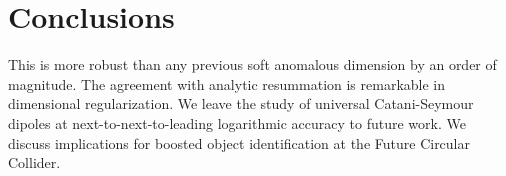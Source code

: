\section{Conclusions}\label{sec:conclusions}

This is more robust than any previous soft anomalous dimension by an
order of magnitude. The agreement with analytic resummation is
remarkable in dimensional regularization. We leave the study of
universal Catani-Seymour dipoles at next-to-next-to-leading logarithmic
accuracy to future work. We discuss implications for boosted object
identification at the Future Circular Collider.

